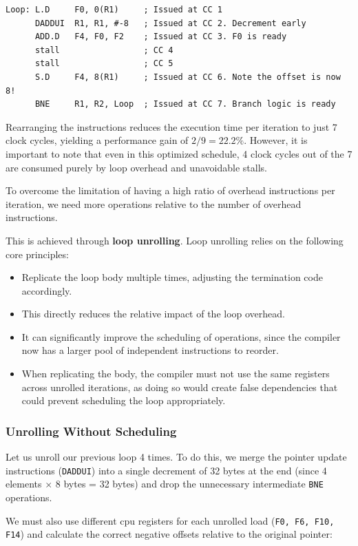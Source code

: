 \begin{lstlisting}[language={[x86masm]Assembler}]
Loop: L.D     F0, 0(R1)     ; Issued at CC 1
      DADDUI  R1, R1, #-8   ; Issued at CC 2. Decrement early
      ADD.D   F4, F0, F2    ; Issued at CC 3. F0 is ready
      stall                 ; CC 4 
      stall                 ; CC 5 
      S.D     F4, 8(R1)     ; Issued at CC 6. Note the offset is now 8!
      BNE     R1, R2, Loop  ; Issued at CC 7. Branch logic is ready
\end{lstlisting}

Rearranging the instructions reduces the execution time per iteration to just 7 clock cycles, yielding a performance gain of \(2/9 = 22.2\%\). However, it is important to note that even in this optimized schedule, 4 clock cycles out of the 7 are consumed purely by loop overhead and unavoidable stalls.

To overcome the limitation of having a high ratio of overhead instructions per iteration, we need more operations relative to the number of overhead instructions. 

This is achieved through \textbf{loop unrolling}. Loop unrolling relies on the following core principles:
\begin{itemize}
    \item Replicate the loop body multiple times, adjusting the termination code accordingly.
    \item This directly reduces the relative impact of the loop overhead.
    \item It can significantly improve the scheduling of operations, since the compiler now has a larger pool of independent instructions to reorder.
    \item When replicating the body, the compiler must not use the same registers across unrolled iterations, as doing so would create false dependencies that could prevent scheduling the loop appropriately.
\end{itemize}

\subsubsection*{Unrolling Without Scheduling}
Let us unroll our previous loop 4 times. To do this, we merge the pointer update instructions (\texttt{DADDUI}) into a single decrement of 32 bytes at the end (since 4 elements \(\times\) 8 bytes = 32 bytes) and drop the unnecessary intermediate \texttt{BNE} operations. 

We must also use different \gls{cpu} registers for each unrolled load (\texttt{F0, F6, F10, F14}) and calculate the correct negative offsets relative to the original pointer:

